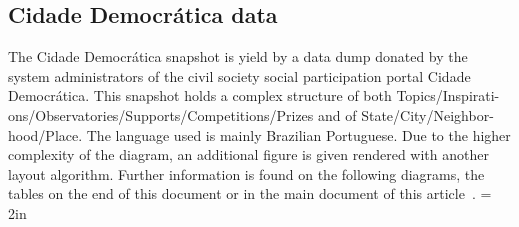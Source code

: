 \begin{apendicesenv}
																					  \section{Cidade Democrática data}
																					  The Cidade Democrática snapshot is yield by a data dump donated by the system
																					  administrators of the civil society social participation portal Cidade
																					  Democrática.
																					  This snapshot holds a complex structure of both
																					  Topics/Inspirati-ons/Observatories/Supports/Competitions/Prizes
																					  and of State/City/Neighbor-hood/Place.
																					  The language used is mainly Brazilian Portuguese.
																					  Due to the higher complexity of the diagram, an additional figure is
																					  given rendered with another layout algorithm.
																					  Further information is found on the following diagrams, the tables on
																					  the end of this document or in the main document of this
																					  article~\cite{losd}.
																							  \textheight = 2in
																							  \pdfpageheight 5in



\end{apendicesenv}
